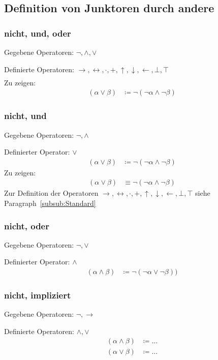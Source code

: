 \documentclass[english,ngerman,parskip=half,headsepline,footsepline,
	fleqn,notitlepage]{scrreprt}
\newcommand*{\defeq}{\coloneqq}%
\newcommand*{\ladd}{+}
\newcommand*{\lmult}{\cdot}
\newcommand*{\ltrue}{\top}%
\newcommand*{\lfalse}{\bot}%
\newcommand*{\lrep}{\leftarrow}%
\newcommand*{\limp}{\rightarrow}%
\newcommand*{\lequiv}{\leftrightarrow}%
\newcommand*{\lnand}{\uparrow}%
\newcommand*{\lnor}{\downarrow}%
\newcommand*{\subsubsectionname}{Paragraph}
\begin{document}
	\subsection{Definition von Junktoren durch andere}%
	\label{sub:Junktordefinitionen}

	\subsubsection{nicht, und, oder}%
	\label{subsub:Standard}
	\label{subsub:OperatorenAnfang}
	Gegebene Operatoren: $\lnot, \land, \lor$\par
	Definierte Operatoren:
	$\limp, \lequiv, \lmult, \ladd, \lnand, \lnor, \lrep, \lfalse, \ltrue$
	\begin{align}
	\end{align}
	Zu zeigen:
	\begin{align}
		(\alpha\lor\beta)&\defeq\lnot(\lnot\alpha\land\lnot\beta)
	\end{align}

	\subsubsection{nicht, und}%
	Gegebene Operatoren: $\lnot, \land$\par
	Definierter Operator: $\lor$
	\begin{align}
		(\alpha\lor\beta)&\defeq\lnot(\lnot\alpha\land\lnot\beta)
	\end{align}
	Zu zeigen:
	\begin{align}
		(\alpha\lor\beta)&\equiv\lnot(\lnot\alpha\land\lnot\beta)
	\end{align}
	Zur Definition der Operatoren $\limp, \lequiv, \lmult, \ladd, \lnand, \lnor,
	\lrep, \lfalse, \ltrue$ siehe \subsubsectionname~\vref{subsub:Standard}

	\subsubsection{nicht, oder}%
	Gegebene Operatoren: $\lnot, \lor$\par
	Definierter Operator: $\land$
	\begin{align}
		(\alpha\land\beta)&\defeq\lnot(\lnot\alpha\lor\lnot\beta))
	\end{align}

	\subsubsection{nicht, impliziert}%
	Gegebene Operatoren: $\lnot, \limp$\par
	Definierte Operatoren: $\land, \lor$
	\begin{align}
		(\alpha\land\beta)&\defeq\dots\\
		(\alpha\lor\beta)&\defeq\dots
	\end{align}
\end{document}
